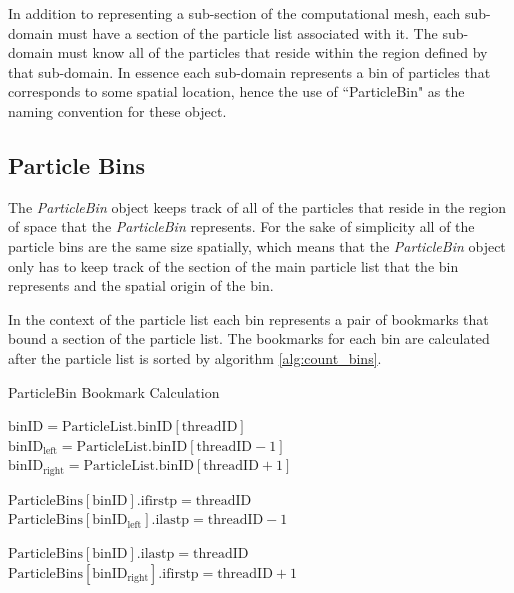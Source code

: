 In addition to representing a sub-section of the computational mesh, each sub-domain must have a section of the particle list associated with it. The sub-domain must know all of the particles that reside within the region defined by that sub-domain. In essence each sub-domain represents a bin of particles that corresponds to some spatial location, hence the use of ``ParticleBin"  as the naming convention for these object.



	\subsection{Particle Bins}
The \emph{ParticleBin} object keeps track of all of the particles that reside in the region of space that the \emph{ParticleBin} represents. For the sake of simplicity all of the particle bins are the same size spatially, which means that the \emph{ParticleBin} object only has to keep track of the section of the main particle list that the bin represents and the spatial origin of the bin. 

In the context of the particle list each bin represents a pair of bookmarks that bound a section of the particle list. The bookmarks for each bin are calculated after the particle list is sorted by algorithm \ref{alg:count_bins}.

\begin{algorithm}
	\caption{ParticleBin Bookmark Calculation}
	\label{alg:count_bins}
	\begin{algorithmic}
			\STATE 
			\STATE $\mathrm{binID} = \mathrm{ParticleList.binID}[\mathrm{threadID}]$
			\STATE $\mathrm{binID_{left}} = \mathrm{ParticleList.binID}[\mathrm{threadID} - 1]$
			\STATE $\mathrm{binID_{right}} = \mathrm{ParticleList.binID}[\mathrm{threadID} + 1]$
			
				\STATE $\mathrm{ParticleBins[binID].ifirstp} = \mathrm{threadID}$
				\STATE $\mathrm{ParticleBins[binID_{left}].ilastp} = \mathrm{threadID} - 1$
			\ENDIF

				\STATE $\mathrm{ParticleBins[binID].ilastp} = \mathrm{threadID}$
				\STATE $\mathrm{ParticleBins[binID_{right}].ifirstp} = \mathrm{threadID} + 1$	
			\ENDIF
			
		\ENDFOR
	\end{algorithmic}
\end{algorithm}


